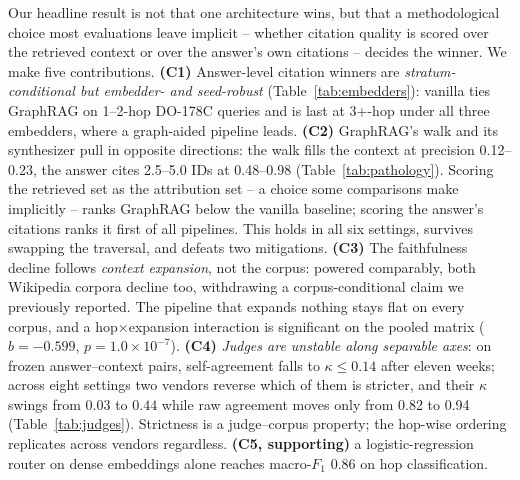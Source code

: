Our headline result is not that one architecture wins, but that a
methodological choice most evaluations leave implicit -- whether
citation quality is scored over the retrieved context or over the
answer's own citations -- decides the winner. We make five
contributions.
\textbf{(C1)} Answer-level citation winners are
\emph{stratum-conditional but embedder- and seed-robust}
(Table~\ref{tab:embedders}): vanilla ties GraphRAG on 1--2-hop DO-178C
queries and is last at 3+-hop under all three embedders, where a
graph-aided pipeline leads.
\textbf{(C2)} GraphRAG's walk and its synthesizer pull in opposite
directions: the walk fills the context at precision 0.12--0.23, the
answer cites 2.5--5.0 IDs at 0.48--0.98
(Table~\ref{tab:pathology}). Scoring the retrieved set as the
attribution set -- a choice some comparisons make implicitly -- ranks
GraphRAG below the vanilla baseline; scoring the answer's citations
ranks it first of all pipelines. This holds in all six settings,
survives swapping the traversal, and defeats two mitigations.
\textbf{(C3)} The faithfulness decline follows \emph{context
expansion}, not the corpus: powered comparably, both Wikipedia corpora
decline too, withdrawing a corpus-conditional claim we previously
reported. The pipeline that expands nothing stays flat on every corpus,
and a hop$\times$expansion interaction is significant on the pooled
matrix ($b{=}{-}0.599$, $p{=}1.0{\times}10^{-7}$).
\textbf{(C4)} \emph{Judges are unstable along separable axes}: on
frozen answer--context pairs, self-agreement falls to
$\kappa{\leq}0.14$ after eleven weeks; across eight settings two vendors
reverse which of them is stricter, and their $\kappa$ swings from $0.03$
to $0.44$ while raw agreement moves only from 0.82 to 0.94
(Table~\ref{tab:judges}). Strictness is a judge--corpus property; the
hop-wise ordering replicates across vendors regardless.
\textbf{(C5, supporting)} a logistic-regression router on dense embeddings
alone reaches macro-$F_1$ $0.86$ on hop classification.
